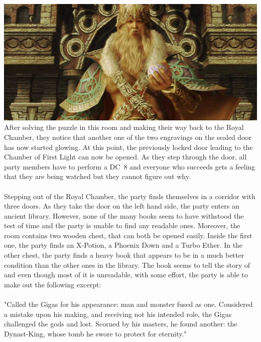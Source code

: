 %
\vfill
%
\includegraphics[width=\columnwidth]{./art/tombofraithwall/raithwall.jpg}
%
\vfill
%
After solving the puzzle in this room and making their way back to the Royal Chamber, they notice that another one of the two engravings on the sealed door has now started glowing.
At this point, the previously locked door leading to the Chamber of First Light can now be opened.
As they step through the door, all party members have to perform a DC~8 and everyone who succeeds gets a feeling that they are being watched but they cannot figure out why.
%
\clearpage
%
%
%
\\\\
%
Stepping out of the Royal Chamber, the party finds themselves in a corridor with three doors.
As they take the door on the left hand side, the party enters an ancient library.
However, none of the many books seem to have withstood the test of time and the party is unable to find any readable ones.
Moreover, the room contains two wooden chest, that can both be opened easily.
Inside the first one, the party finds an X-Potion, a Phoenix Down and a Turbo Ether.
In the other chest, the party finds a heavy book that appears to be in a much better condition than the other ones in the library.
The book seems to tell the story of  and even though most of it is unreadable, with some effort, the party is able to make out the following excerpt:
%
\\\\
%
"Called the Gigas for his appearance: man and monster fused as one. Considered a mistake upon his making, and receiving not his intended role, the Gigas challenged the gods and lost. Scorned by his masters, he found another: the Dynast-King, whose tomb he swore to protect for eternity."

